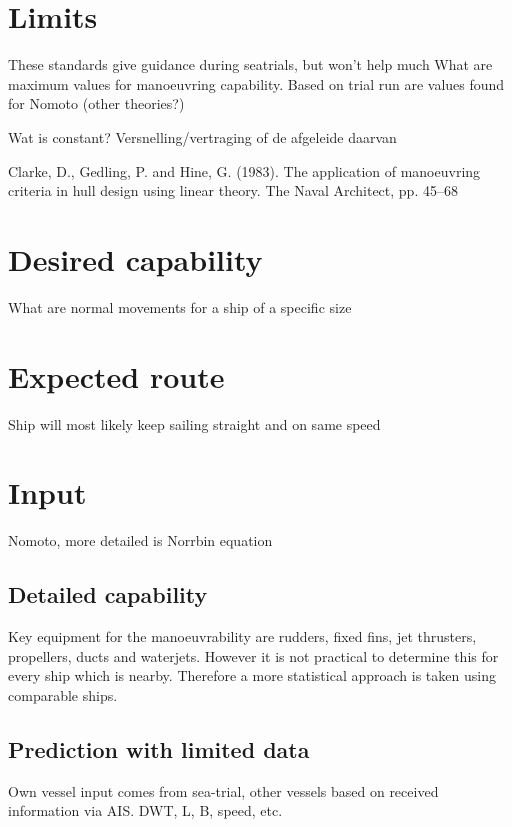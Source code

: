 \section{Limits}
These standards give guidance during seatrials, but won't help much 
What are maximum values for manoeuvring capability. Based on trial run are values found for Nomoto (other theories?)

Wat is constant? Versnelling/vertraging of de afgeleide daarvan

Clarke, D., Gedling, P. and Hine, G. (1983). The application of manoeuvring criteria in hull design using linear theory. The Naval Architect, pp. 45–68

\section{Desired capability}
What are normal movements for a ship of a specific size

\section{Expected route}
Ship will most likely keep sailing straight and on same speed

\section{Input}
Nomoto, more detailed is Norrbin equation

\subsection{Detailed capability}
Key equipment for the manoeuvrability are rudders, fixed fins, jet thrusters, propellers, ducts and waterjets. However it is not practical to determine this for every ship which is nearby. Therefore a more statistical approach is taken using comparable ships.






\subsection{Prediction with limited data}
Own vessel input comes from sea-trial, other vessels based on received information via AIS.
DWT, L, B, speed, etc.

